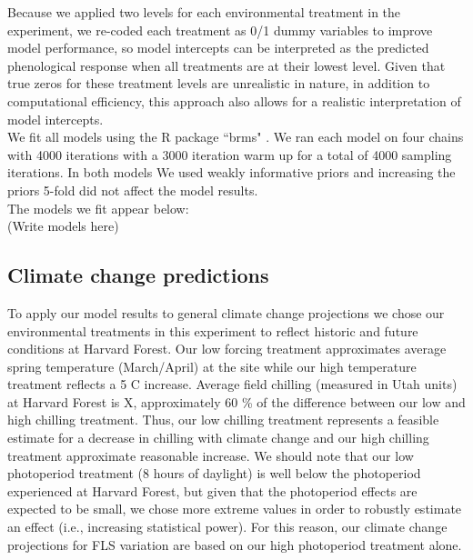 \documentclass[11pt]{article}
\begin{document}
\noindent Because we applied two levels for each environmental treatment in the experiment, we re-coded each treatment as 0/1 dummy variables to improve model performance, so model intercepts can be interpreted as the predicted phenological response when all treatments are at their lowest level. Given that true zeros for these treatment levels are unrealistic in nature, in addition to computational efficiency, this approach also allows for a realistic interpretation of model intercepts.\\  

\noindent We fit all models using the R package ``brms" \citep{}. We ran each model on four chains with 4000 iterations with a 3000 iteration warm up for a total of 4000 sampling iterations. In both models We used weakly informative priors and increasing the priors 5-fold did not affect the model results.\\

The models we fit appear below:\\
(Write models here)
\subsection*{Climate change predictions}
\noindent To apply our model results to general climate change projections we chose our environmental treatments in this experiment to reflect historic and future conditions at Harvard Forest. Our low forcing treatment approximates average spring temperature (March/April) at the site while our high temperature treatment reflects a 5 \degree C increase. Average field chilling (measured in Utah units) at Harvard Forest is X, approximately 60 \% of the difference between our low and high chilling treatment. Thus, our low chilling treatment represents a feasible estimate for a decrease in chilling with climate change and our high chilling treatment approximate reasonable increase. We should note that our low photoperiod treatment (8 hours of daylight) is well below the photoperiod experienced at Harvard Forest, but given that the photoperiod effects are expected to be small, we chose more extreme values in order to robustly estimate an effect (i.e., increasing statistical power). For this reason, our climate change projections for FLS variation are based on our high photoperiod treatment alone.\\
\end{document}
